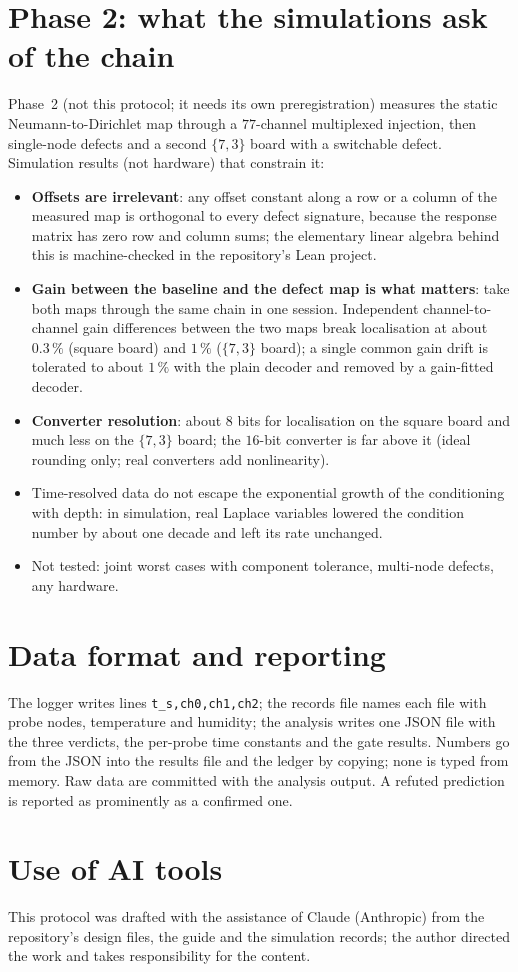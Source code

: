 \documentclass[11pt,a4paper]{article}
\begin{document}
\section{Phase 2: what the simulations ask of the chain}
Phase~2 (not this protocol; it needs its own preregistration) measures the static Neumann-to-Dirichlet map through a $77$-channel multiplexed injection, then single-node defects and a second $\{7,3\}$ board with a switchable defect. Simulation results (not hardware) that constrain it:
\begin{itemize}
\item \textbf{Offsets are irrelevant}: any offset constant along a row or a column of the measured map is orthogonal to every defect signature, because the response matrix has zero row and column sums; the elementary linear algebra behind this is machine-checked in the repository's Lean project.
\item \textbf{Gain between the baseline and the defect map is what matters}: take both maps through the same chain in one session. Independent channel-to-channel gain differences between the two maps break localisation at about $0.3\,\%$ (square board) and $1\,\%$ ($\{7,3\}$ board); a single common gain drift is tolerated to about $1\,\%$ with the plain decoder and removed by a gain-fitted decoder.
\item \textbf{Converter resolution}: about $8$ bits for localisation on the square board and much less on the $\{7,3\}$ board; the $16$-bit converter is far above it (ideal rounding only; real converters add nonlinearity).
\item Time-resolved data do not escape the exponential growth of the conditioning with depth: in simulation, real Laplace variables lowered the condition number by about one decade and left its rate unchanged.
\item Not tested: joint worst cases with component tolerance, multi-node defects, any hardware.
\end{itemize}

\section{Data format and reporting}
The logger writes lines \texttt{t\_s,ch0,ch1,ch2}; the records file names each file with probe nodes, temperature and humidity; the analysis writes one JSON file with the three verdicts, the per-probe time constants and the gate results. Numbers go from the JSON into the results file and the ledger by copying; none is typed from memory.
Raw data are committed with the analysis output. A refuted prediction is reported as prominently as a confirmed one.

\section*{Use of AI tools}
This protocol was drafted with the assistance of Claude (Anthropic) from the repository's design files, the guide and the simulation records; the author directed the work and takes responsibility for the content.
\end{document}
